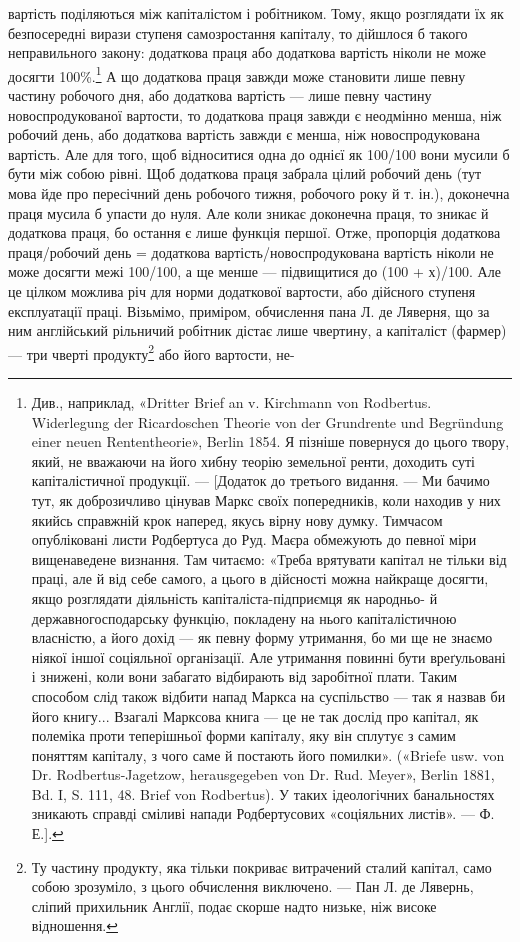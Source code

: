 \parcont{}  %
вартість поділяються між капіталістом і робітником. Тому, якщо
розглядати їх як безпосередні вирази ступеня самозростання
капіталу, то дійшлося б такого неправильного закону: додаткова
праця або додаткова вартість ніколи не може досягти 100\%.\footnote{
Див., наприклад, «Dritter Brief an v. Kirchmann von Rodbertus.
Widerlegung der Ricardoschen Theorie von der Grundrente und Begründung
einer neuen Rententheorie», Berlin 1854. Я пізніше повернуся
до цього твору, який, не вважаючи на його хибну теорію земельної ренти,
доходить суті капіталістичної продукції. — [Додаток до третього видання.
— Ми бачимо тут, як доброзичливо цінував Маркс своїх попередників,
коли находив у них якийсь справжній крок наперед, якусь вірну
нову думку. Тимчасом опубліковані листи Родбертуса до Руд. Маєра
обмежують до певної міри вищенаведене визнання. Там читаємо: «Треба
врятувати капітал не тільки від праці, але й від себе самого, а цього в
дійсності можна найкраще досягти, якщо розглядати діяльність капіталіста-підприємця як народньо- й
державногосподарську функцію,
покладену на нього капіталістичною власністю, а його дохід — як певну
форму утримання, бо ми ще не знаємо ніякої іншої соціяльної організації.
Але утримання повинні бути вреґульовані і знижені, коли вони
забагато відбирають від заробітної плати. Таким способом слід також
відбити напад Маркса на суспільство — так я назвав би його книгу...
Взагалі Марксова книга — це не так дослід про капітал, як полеміка
проти теперішньої форми капіталу, яку він сплутує з самим поняттям
капіталу, з чого саме й постають його помилки». («Briefe usw. von Dr.
Rodbertus-Jagetzow, herausgegeben von Dr. Rud. Meyer», Berlin 1881,
Bd. I, S. 111, 48. Brief von Rodbertus). У таких ідеологічних банальностях
зникають справді сміливі напади Родбертусових «соціяльних листів».
— Ф. Е.].
}
А що додаткова праця завжди може становити лише певну частину
робочого дня, або додаткова вартість — лише певну частину
новоспродукованої вартости, то додаткова праця завжди є неодмінно
менша, ніж робочий день, або додаткова вартість завжди
є менша, ніж новоспродукована вартість. Але для того, щоб
відноситися одна до однієї як 100/100 вони мусили б бути між собою
рівні. Щоб додаткова праця забрала цілий робочий день (тут
мова йде про пересічний день робочого тижня, робочого року
й т. ін.), доконечна праця мусила б упасти до нуля. Але коли
зникає доконечна праця, то зникає й додаткова праця, бо остання
є лише функція першої. Отже, пропорція додаткова праця/робочий день =
додаткова вартість/новоспродукована вартість ніколи не може досягти межі
100/100, а ще менше — підвищитися до (100 + х)/100. Але це цілком можлива річ
для норми додаткової вартости, або дійсного ступеня експлуатації
праці. Візьмімо, приміром, обчислення пана Л. де Ляверня,
що за ним англійський рільничий робітник дістає лише чвертину,
а капіталіст (фармер) — три чверті продукту\footnote{
Ту частину продукту, яка тільки покриває витрачений сталий
капітал, само собою зрозуміло, з цього обчислення виключено. — Пан
Л. де Лявернь, сліпий прихильник Англії, подає скорше надто низьке,
ніж високе відношення.
} або його вартости, не-
\parbreak{}  %
